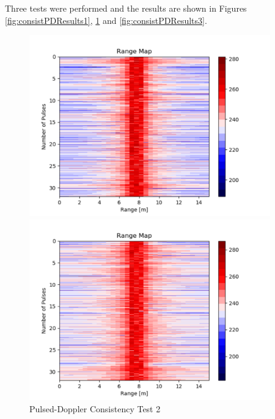 Three tests were performed and the results are shown in Figures \ref{fig:consistPDResults1}, \ref{fig:consistPDResults2} and \ref{fig:consistPDResults3}.

\begin{figure}[h!]
    \centering
    \begin{minipage}{0.48\textwidth}
        \centering
        \includegraphics[width = 0.93\textwidth]{images/consistPDResults1.pdf}
        \caption{Pulsed-Doppler Consistency Test 1}\label{fig:consistPDResults1}
    \end{minipage}\hfill
    \begin{minipage}{0.48\textwidth}
        \centering
        \includegraphics[width=0.93\textwidth]{images/consistPDResults2.pdf}
        \caption{Pulsed-Doppler Consistency Test 2}\label{fig:consistPDResults2}
    \end{minipage}
\end{figure}

